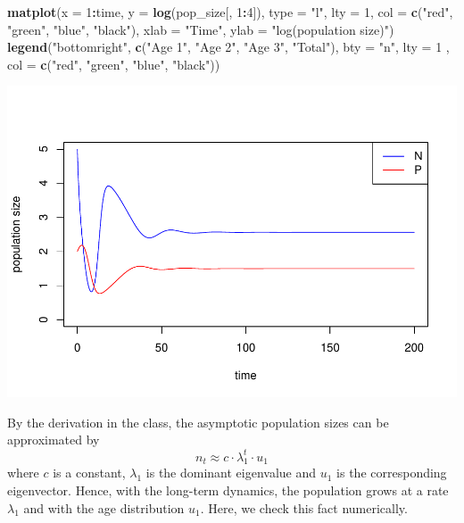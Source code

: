 \documentclass[
]{book}
\newenvironment{Shaded}{\begin{snugshade}}{\end{snugshade}}
\newcommand{\AttributeTok}[1]{\textcolor[rgb]{0.13,0.29,0.53}{#1}}
\newcommand{\DecValTok}[1]{\textcolor[rgb]{0.00,0.00,0.81}{#1}}
\newcommand{\FunctionTok}[1]{\textcolor[rgb]{0.13,0.29,0.53}{\textbf{#1}}}
\newcommand{\NormalTok}[1]{#1}
\newcommand{\SpecialCharTok}[1]{\textcolor[rgb]{0.81,0.36,0.00}{\textbf{#1}}}
\newcommand{\StringTok}[1]{\textcolor[rgb]{0.31,0.60,0.02}{#1}}
\begin{document}
\begin{Shaded}
\begin{Highlighting}[]
\FunctionTok{matplot}\NormalTok{(}\AttributeTok{x =} \DecValTok{1}\SpecialCharTok{:}\NormalTok{time, }\AttributeTok{y =} \FunctionTok{log}\NormalTok{(pop\_size[, }\DecValTok{1}\SpecialCharTok{:}\DecValTok{4}\NormalTok{]), }\AttributeTok{type =} \StringTok{"l"}\NormalTok{, }\AttributeTok{lty =} \DecValTok{1}\NormalTok{,}
        \AttributeTok{col =} \FunctionTok{c}\NormalTok{(}\StringTok{"red"}\NormalTok{, }\StringTok{"green"}\NormalTok{, }\StringTok{"blue"}\NormalTok{, }\StringTok{"black"}\NormalTok{),}
        \AttributeTok{xlab =} \StringTok{"Time"}\NormalTok{, }\AttributeTok{ylab =} \StringTok{"log(population size)"}\NormalTok{)}
\FunctionTok{legend}\NormalTok{(}\StringTok{"bottomright"}\NormalTok{, }\FunctionTok{c}\NormalTok{(}\StringTok{"Age 1"}\NormalTok{, }\StringTok{"Age 2"}\NormalTok{, }\StringTok{"Age 3"}\NormalTok{, }\StringTok{"Total"}\NormalTok{), }\AttributeTok{bty =} \StringTok{"n"}\NormalTok{,}
       \AttributeTok{lty =} \DecValTok{1}\NormalTok{ , }\AttributeTok{col =} \FunctionTok{c}\NormalTok{(}\StringTok{"red"}\NormalTok{, }\StringTok{"green"}\NormalTok{, }\StringTok{"blue"}\NormalTok{, }\StringTok{"black"}\NormalTok{))}
\end{Highlighting}
\end{Shaded}

\includegraphics{bookdown-demo_files/figure-latex/unnamed-chunk-34-1.pdf}

By the derivation in the class, the asymptotic population sizes can be approximated by
\[
n_t \approx c\cdot \lambda_1^t\cdot u_1
\]
where \(c\) is a constant, \(\lambda_1\) is the dominant eigenvalue and \(u_1\) is the corresponding eigenvector. Hence, with the long-term dynamics, the population grows at a rate \(\lambda_1\) and with the age distribution \(u_1\). Here, we check this fact numerically.
\end{document}
